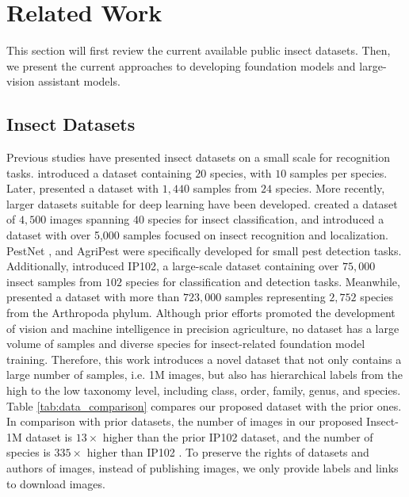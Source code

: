\section{Related Work}
This section will first review the current available public insect datasets. Then, we present the current approaches to developing foundation models and large-vision assistant models.

\subsection{Insect Datasets}

Previous studies have presented insect datasets on a small scale for recognition tasks.
\cite{venugoban2014image} introduced a dataset containing $20$ species, with $10$ samples per species.
Later, \cite{xie2015automatic} presented a dataset with $1,440$ samples from $24$ species. 
More recently, larger datasets suitable for deep learning have been developed. \cite{xie2018multi} created a dataset of $4,500$ images spanning $40$ species for insect classification, and \cite{liu2016localization} introduced a dataset with over 5,000 samples focused on insect recognition and localization. 
PestNet \cite{liu2019pestnet}, and AgriPest \cite{wang2021agripest} were specifically developed for small pest detection tasks.
Additionally, \cite{wu2019ip102} introduced IP102, a large-scale dataset containing over $75,000$ insect samples from $102$ species for classification and detection tasks. 
Meanwhile, \cite{van2021benchmarking} presented a dataset with more than $723,000$ samples representing $2,752$ species from the Arthropoda phylum.
Although prior efforts promoted the development of vision and machine intelligence in precision agriculture, no dataset has a large volume of samples and diverse species for insect-related foundation model training. 
Therefore, this work introduces a novel dataset that not only contains a large number of samples, i.e. 1M images, but also has hierarchical labels from the high to the low taxonomy level, including class, order, family, genus, and species.
Table \ref{tab:data_comparison}  compares our proposed dataset with the prior ones.
In comparison with prior datasets, the number of images in our proposed Insect-1M dataset is $13\times$ higher than the prior IP102 dataset, and the number of species is $335\times$ higher than IP102 \cite{wu2019ip102}.
To preserve the rights of datasets and authors of images, instead of publishing images, we only provide labels and links to download images.


